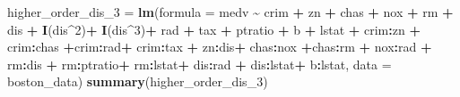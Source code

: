\documentclass[
]{article}
\newenvironment{Shaded}{\begin{snugshade}}{\end{snugshade}}
\newcommand{\AttributeTok}[1]{\textcolor[rgb]{0.13,0.29,0.53}{#1}}
\newcommand{\DecValTok}[1]{\textcolor[rgb]{0.00,0.00,0.81}{#1}}
\newcommand{\FunctionTok}[1]{\textcolor[rgb]{0.13,0.29,0.53}{\textbf{#1}}}
\newcommand{\NormalTok}[1]{#1}
\newcommand{\OtherTok}[1]{\textcolor[rgb]{0.56,0.35,0.01}{#1}}
\newcommand{\SpecialCharTok}[1]{\textcolor[rgb]{0.81,0.36,0.00}{\textbf{#1}}}
\begin{document}
\begin{Shaded}
\begin{Highlighting}[]
\NormalTok{higher\_order\_dis\_3 }\OtherTok{=} \FunctionTok{lm}\NormalTok{(}\AttributeTok{formula =}\NormalTok{ medv }\SpecialCharTok{\textasciitilde{}}\NormalTok{ crim }\SpecialCharTok{+}\NormalTok{ zn }\SpecialCharTok{+}\NormalTok{ chas }\SpecialCharTok{+}\NormalTok{ nox }\SpecialCharTok{+}\NormalTok{ rm }\SpecialCharTok{+}\NormalTok{ dis }\SpecialCharTok{+} \FunctionTok{I}\NormalTok{(dis}\SpecialCharTok{\^{}}\DecValTok{2}\NormalTok{)}\SpecialCharTok{+} \FunctionTok{I}\NormalTok{(dis}\SpecialCharTok{\^{}}\DecValTok{3}\NormalTok{)}\SpecialCharTok{+}\NormalTok{ rad }\SpecialCharTok{+}\NormalTok{ tax }\SpecialCharTok{+}\NormalTok{ ptratio }\SpecialCharTok{+}\NormalTok{ b }\SpecialCharTok{+}\NormalTok{ lstat }\SpecialCharTok{+}\NormalTok{ crim}\SpecialCharTok{:}\NormalTok{zn }\SpecialCharTok{+}\NormalTok{ crim}\SpecialCharTok{:}\NormalTok{chas  }\SpecialCharTok{+}\NormalTok{crim}\SpecialCharTok{:}\NormalTok{rad}\SpecialCharTok{+}\NormalTok{ crim}\SpecialCharTok{:}\NormalTok{tax }\SpecialCharTok{+}\NormalTok{ zn}\SpecialCharTok{:}\NormalTok{dis}\SpecialCharTok{+}\NormalTok{ chas}\SpecialCharTok{:}\NormalTok{nox }\SpecialCharTok{+}\NormalTok{chas}\SpecialCharTok{:}\NormalTok{rm }\SpecialCharTok{+}\NormalTok{ nox}\SpecialCharTok{:}\NormalTok{rad }\SpecialCharTok{+}\NormalTok{ rm}\SpecialCharTok{:}\NormalTok{dis }\SpecialCharTok{+}\NormalTok{ rm}\SpecialCharTok{:}\NormalTok{ptratio}\SpecialCharTok{+}\NormalTok{ rm}\SpecialCharTok{:}\NormalTok{lstat}\SpecialCharTok{+}\NormalTok{ dis}\SpecialCharTok{:}\NormalTok{rad }\SpecialCharTok{+}\NormalTok{ dis}\SpecialCharTok{:}\NormalTok{lstat}\SpecialCharTok{+}\NormalTok{ b}\SpecialCharTok{:}\NormalTok{lstat, }\AttributeTok{data =}\NormalTok{ boston\_data)}
\FunctionTok{summary}\NormalTok{(higher\_order\_dis\_3)}
\end{Highlighting}
\end{Shaded}
\end{document}
